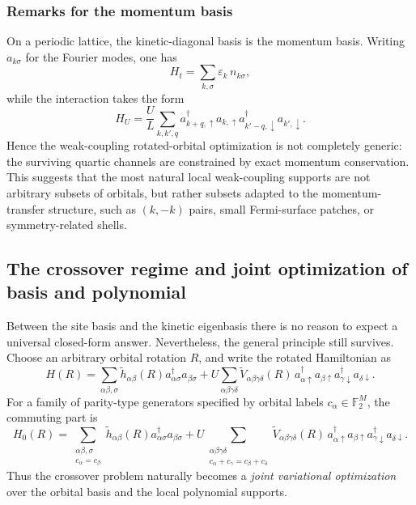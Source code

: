 \documentclass[11pt]{article}
\theoremstyle{definition}
\theoremstyle{remark}
\begin{document}
\subsubsection{Remarks for the momentum basis}
On a periodic lattice, the kinetic-diagonal basis is the momentum basis. Writing $a_{k\sigma}$ for the Fourier modes, one has
\begin{equation}
  H_t=\sum_{k,\sigma}\varepsilon_k\,n_{k\sigma},
\end{equation}
while the interaction takes the form
\begin{equation}
  H_U
  =
  \frac{U}{L}\sum_{k,k',q}
  a_{k+q,\uparrow}^\dagger a_{k,\uparrow}
  a_{k'-q,\downarrow}^\dagger a_{k',\downarrow}.
\end{equation}
Hence the weak-coupling rotated-orbital optimization is not completely generic: the surviving quartic channels are constrained by exact momentum conservation. This suggests that the most natural local weak-coupling supports are not arbitrary subsets of orbitals, but rather subsets adapted to the momentum-transfer structure, such as $(k,-k)$ pairs, small Fermi-surface patches, or symmetry-related shells.

\subsection{The crossover regime and joint optimization of basis and polynomial}
Between the site basis and the kinetic eigenbasis there is no reason to expect a universal closed-form answer. Nevertheless, the general principle still survives. Choose an arbitrary orbital rotation $R$, and write the rotated Hamiltonian as
\begin{equation}
  H(R)
  =
  \sum_{\alpha\beta,\sigma}\widetilde h_{\alpha\beta}(R)
  a_{\alpha\sigma}^\dagger a_{\beta\sigma}
  +U\sum_{\alpha\beta\gamma\delta}
  \widetilde V_{\alpha\beta\gamma\delta}(R)
  \,a_{\alpha\uparrow}^\dagger a_{\beta\uparrow}
  a_{\gamma\downarrow}^\dagger a_{\delta\downarrow}.
\end{equation}
For a family of parity-type generators specified by orbital labels $c_\alpha\in\mathbb F_2^M$, the commuting part is
\begin{equation}
  H_0(R)
  =
  \sum_{\substack{\alpha\beta,\sigma\\ c_\alpha=c_\beta}}
  \widetilde h_{\alpha\beta}(R)
  a_{\alpha\sigma}^\dagger a_{\beta\sigma}
  +U\sum_{\substack{\alpha\beta\gamma\delta\\ c_\alpha+c_\gamma=c_\beta+c_\delta}}
  \widetilde V_{\alpha\beta\gamma\delta}(R)
  \,a_{\alpha\uparrow}^\dagger a_{\beta\uparrow}
  a_{\gamma\downarrow}^\dagger a_{\delta\downarrow}.
  \label{eq:cross-H0}
\end{equation}
Thus the crossover problem naturally becomes a \emph{joint variational optimization} over the orbital basis and the local polynomial supports.
\end{document}
